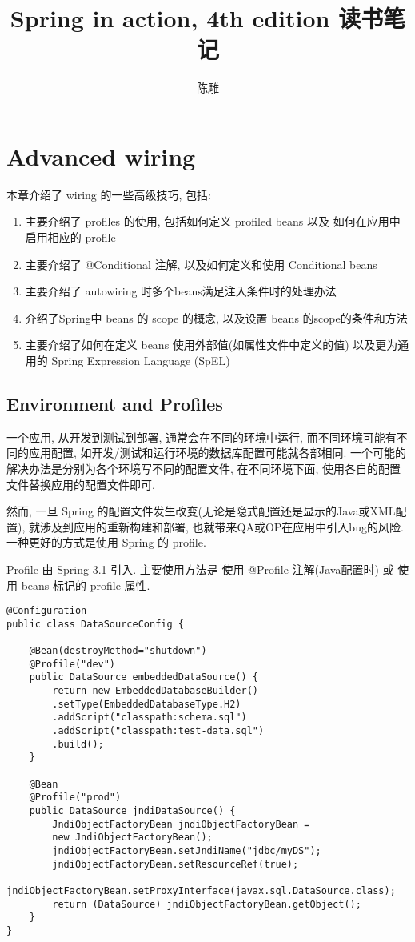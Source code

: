 \documentclass[UTF8, heading=true, scheme=chinese]{ctexart}
\title{Spring in action, 4th edition 读书笔记}
\author{陈雕}
\begin{document}
\maketitle
\newpage

\tableofcontents
\newpage


\section[Advanced wiring]{Advanced wiring}
本章介绍了 wiring 的一些高级技巧, 包括:
\begin{enumerate}
	\item[\nameref{sec:profiles}] 主要介绍了 profiles 的使用, 包括如何定义 profiled beans 以及 如何在应用中启用相应的 profile
	\item[\nameref{sec:conditional}] 主要介绍了 @Conditional 注解, 以及如何定义和使用 Conditional beans
	\item[\nameref{sec:qualifiers}] 主要介绍了 autowiring 时多个beans满足注入条件时的处理办法
	\item[\nameref{sec:scope}] 介绍了Spring中 beans 的 scope 的概念, 以及设置 beans 的scope的条件和方法
	\item[\nameref{sec:runtime}] 主要介绍了如何在定义 beans 使用外部值(如属性文件中定义的值) 以及更为通用的 Spring Expression Language (SpEL)
\end{enumerate}


\subsection[Environment and Profiles]{Environment and Profiles} \label{sec:profiles}
一个应用, 从开发到测试到部署, 通常会在不同的环境中运行, 而不同环境可能有不同的应用配置, 如开发/测试和运行环境的数据库配置可能就各部相同.
一个可能的解决办法是分别为各个环境写不同的配置文件, 在不同环境下面, 使用各自的配置文件替换应用的配置文件即可.

然而, 一旦 Spring 的配置文件发生改变(无论是隐式配置还是显示的Java或XML配置), 就涉及到应用的重新构建和部署, 也就带来QA或OP在应用中引入bug的风险.
一种更好的方式是使用 Spring 的 profile.

Profile 由 Spring 3.1 引入. 主要使用方法是 使用 @Profile 注解(Java配置时) 或 使用 beans 标记的 profile 属性.
\begin{verbatim}
@Configuration
public class DataSourceConfig {

	@Bean(destroyMethod="shutdown")
	@Profile("dev")
	public DataSource embeddedDataSource() {
		return new EmbeddedDatabaseBuilder()
		.setType(EmbeddedDatabaseType.H2)
		.addScript("classpath:schema.sql")
		.addScript("classpath:test-data.sql")
		.build();
	}
		
	@Bean
	@Profile("prod")
	public DataSource jndiDataSource() {
		JndiObjectFactoryBean jndiObjectFactoryBean =
		new JndiObjectFactoryBean();
		jndiObjectFactoryBean.setJndiName("jdbc/myDS");
		jndiObjectFactoryBean.setResourceRef(true);
		jndiObjectFactoryBean.setProxyInterface(javax.sql.DataSource.class);
		return (DataSource) jndiObjectFactoryBean.getObject();
	}
}
\end{verbatim}
\end{document}
